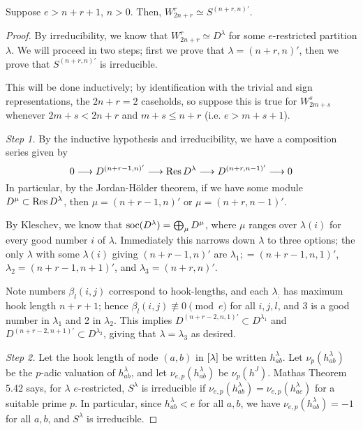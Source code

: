 \documentclass{amsart}
\begin{document}
\begin{theorem}
  Suppose $e > n + r + 1$, $n > 0$.
  Then, $W_{2n + r}^r \simeq S^{(n+r,n)'}$.
\end{theorem}
\begin{proof}
  By irreducibility, we know that $W_{2n + r}^r \simeq D^\lambda$ for some $e$-restricted partition $\lambda$.
  We will proceed in two steps;
  first we prove that $\lambda = (n+r,n)'$, then we prove that $S^{(n+r,n)'}$ is irreducible.

  This will be done inductively; by identification with the trivial and sign representations, the $2n + r = 2$ caseholds, so suppose this is true for $W_{2m + s}^s$ whenever $2m + s < 2n + r$ and $m + s \leq n + r$ (i.e. $e > m + s + 1$).

  \def\thmsep{7pt}
  \vspace{\thmsep}
  \textit{Step 1.}
  By the inductive hypothesis and irreducibility, we have a composition series given by 
  \begin{equation}
    \label{Composition Series} 0 \longrightarrow D^{(n + r - 1,n)'} \longrightarrow \text{Res} \, D^\lambda \longrightarrow D^{(n+r,n-1)'} \longrightarrow 0
  \end{equation}
  In particular, by the Jordan-H\"older theorem, if we have some module $D^\mu \subset \text{Res} \, D^\lambda$, then $\mu = (n+r-1,n)'$ or $\mu = (n+r,n-1)'$.
  
  By Kleschev, we know that $\text{soc}(D^\lambda) = \bigoplus_{\mu} D^\mu$, where $\mu$ ranges over $\lambda(i)$ for every good number $i$ of $\lambda$.
  Immediately this narrows down $\lambda$ to three options;
  the only $\lambda$ with some $\lambda(i)$ giving $(n + r - 1,n)'$ are $\lambda_1 ;= (n+r-1,n,1)'$, $\lambda_2 = (n+r-1,n+1)'$, and $\lambda_3 = (n+r,n)'$.

  Note numbers $\beta_l(i,j)$ correspond to hook-lengths, and each $\lambda_;$ has maximum hook length $n + r + 1$;
  hence $\beta_l(i,j) \not\equiv 0 \pmod e$ for all $i,j,l$, and 3 is a good number in $\lambda_1$ and 2 in $\lambda_2$.
  This implies $D^{(n+r-2,n,1)'} \subset D^{\lambda_1}$ and $D^{(n+r-2,n+1)'} \subset D^{\lambda_2}$, giving that $\lambda = \lambda_3$ as desired.

  \vspace{\thmsep}
  \textit{Step 2.}
  Let the hook length of node $(a,b)$ in $\left[ \lambda \right]$ be written $h_{ab}^\lambda$.
  Let $\nu_p(h_{ab}^\lambda)$ be the $p$-adic valuation of $h_{ab}^\lambda$, and let $\nu_{e,p}(h_{ab}^\lambda)$ be $\nu_p(h^{J})$.
  Mathas Theorem 5.42 says, for $\lambda$ $e$-restricted, $S^\lambda$ is irreducible if $\nu_{e,p}(h_{ab}^\lambda) = \nu_{e,p}(h_{ac}^\lambda)$ for a suitable prime $p$.
  In particular, since $h_{ab}^\lambda < e$ for all $a,b$, we have $\nu_{e,p}(h_{ab}^\lambda) = -1$ for all $a,b$, and $S^\lambda$ is irreducible.
\end{proof}
\end{document}

